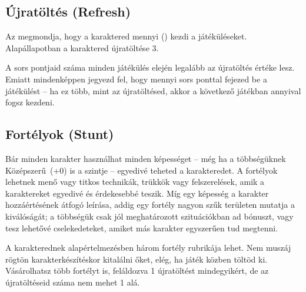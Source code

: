 \label{Újratöltés}
\subsection[Újratöltés]{Újratöltés (Refresh)}

Az  megmondja, hogy a karaktered mennyi  () kezdi a játéküléseket. Alapállapotban a karaktered újratöltése 3.

A sors pontjaid száma minden játékülés elején legalább az újratöltés értéke lesz. Emiatt mindenképpen jegyezd fel, hogy mennyi sors ponttal fejezed be a játékülést -- ha ez több, mint az újratöltésed, akkor a következő játékban annyival fogsz kezdeni.


\subsection[Fortélyok]{Fortélyok (Stunt)}

Bár minden karakter használhat minden képességet -- még ha a többségüknek Középszerű~(+0) is a szintje --  egyedivé teheted a karakteredet. A fortélyok lehetnek menő vagy titkos technikák, trükkök vagy felszerelések, amik a karaktereket egyedivé és érdekesebbé teszik. Míg egy képesség a karakter hozzáértésének átfogó leírása, addig egy fortély nagyon szűk területen mutatja a kiválóságát; a többségük csak jól meghatározott szituációkban ad bónuszt, vagy tesz lehetővé cselekedeteket, amiket más karakter egyszerűen tud megtenni.

A karakterednek alapértelmezésben három fortély rubrikája lehet. Nem muszáj rögtön karakterkészítéskor kitalálni őket, elég, ha játék közben töltöd ki. Vásárolhatsz több fortélyt is, feláldozva 1 újratöltést mindegyikért, de az újratöltéseid száma nem mehet 1 alá.
